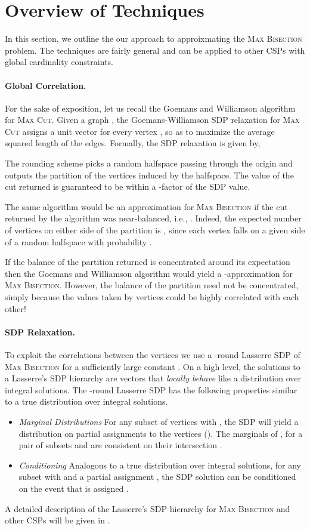 \documentclass[11pt]{article}
\theoremstyle{definition}
\newcommand{\problemmacro}[1]{\texorpdfstring{\textsc{#1}}{#1}\xspace}
\newcommand{\maxcut}{\problemmacro{Max Cut}}
\newcommand{\maxbisection}{\problemmacro{Max Bisection}}
\numberwithin{equation}{section}
\let\origparagraph\paragraph
\renewcommand{\paragraph}[1]{\origparagraph{#1.}}
\let\pref=\prettyref
\begin{document}
\section{Overview of Techniques} \label{sec:overview}

In this section, we outline the our approach to approixmating the
\maxbisection problem.  The techniques are fairly general and can be applied to other CSPs with global cardinality constraints.


\paragraph{Global Correlation}
For the sake of exposition, let us recall the Goemans and Williamson algorithm
for \maxcut.
Given a graph , the Goemans-Williamson SDP relaxation for
\maxcut assigns a unit vector  for every vertex , so as to maximize the average squared length  of the edges.  Formally, the SDP relaxation is given by,

The rounding scheme picks a random halfspace passing through the
origin and outputs the partition of the vertices induced by the
halfspace.  The value of the cut returned is guaranteed to be within a
-factor of the SDP value.

The same algorithm would be an approximation for \maxbisection if the
cut returned by the algorithm was near-balanced, i.e., .  Indeed, the expected number of vertices on either side of the
partition is , since each vertex  falls on a given
side of a random halfspace with probability .

If the balance of the partition returned is concentrated around its
expectation then the Goemans and Williamson algorithm would yield a
-approximation for \maxbisection.   However, the balance of the
partition need not be concentrated, simply because the values taken by
vertices could be highly correlated with each other!


\paragraph{SDP Relaxation}
To exploit the correlations between the vertices we use a -round Lasserre SDP
\cite{Lasserre01} of \maxbisection for a sufficiently large constant .  On a high
level, the solutions to a Lasserre's SDP hierarchy are vectors
that {\it locally behave} like a distribution over integral solutions.
The -round Lasserre SDP has the following properties similar to
a true distribution over integral solutions.
\begin{itemize}
\item {\it Marginal Distributions} For any subset  of vertices with , the SDP will
yield a distribution  on partial assignments to the vertices
().  The marginals of ,  for a pair of
subsets  and  are consistent on their intersection .
\item {\it Conditioning} Analogous to a true distribution over
integral solutions, for any subset  with 
and a partial assignment , the SDP solution can
be conditioned on the event that  is assigned .
\end{itemize}
A detailed description of the Lasserre's SDP hierarchy for \maxbisection and other CSPs will be given in \pref{sec:prelim}.
\end{document}
